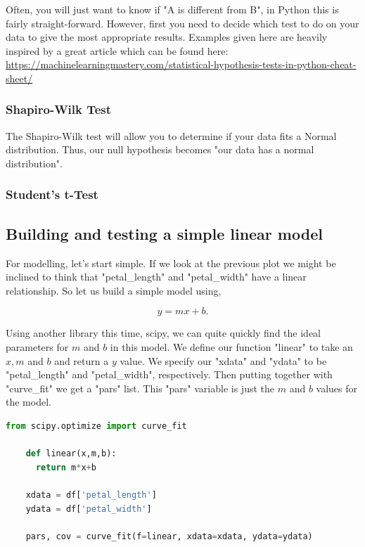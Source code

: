 \documentclass[12pt]{article}
\begin{document}
Often, you will just want to know if "A is different from B", in Python this is fairly straight-forward. However, first you need to decide which test to do on your data to give the most appropriate results. Examples given here are heavily inspired by a great article which can be found here: \href{https://machinelearningmastery.com/statistical-hypothesis-tests-in-python-cheat-sheet/}{https://machinelearningmastery.com/statistical-hypothesis-tests-in-python-cheat-sheet/}

\subsubsection{Shapiro-Wilk Test}

The Shapiro-Wilk test will allow you to determine if your data fits a Normal distribution. Thus, our null hypothesis becomes "our data has a normal distribution". 

\subsubsection{Student's t-Test}


\subsection{Building and testing a simple linear model}

For modelling, let's start simple. If we look at the previous plot we might be inclined to think that "petal\_length" and "petal\_width" have a linear relationship. So let us build a simple model using, 

\begin{equation}
    y = mx+b.
\end{equation}

Using another library this time, scipy, we can quite quickly find the ideal parameters for $m$ and $b$ in this model. We define our function "linear" to take an $x,m$ and $b$ and return a $y$ value. We specify our "xdata" and "ydata" to be "petal\_length" and "petal\_width", respectively. Then putting together with "curve\_fit" we get a "pars" list. This "pars" variable is just the $m$ and $b$ values for the model.  


\begin{lstlisting}[language=Python]
    from scipy.optimize import curve_fit

    def linear(x,m,b):
      return m*x+b
    
    xdata = df['petal_length']
    ydata = df['petal_width']
    
    pars, cov = curve_fit(f=linear, xdata=xdata, ydata=ydata)
\end{lstlisting}
\end{document}
